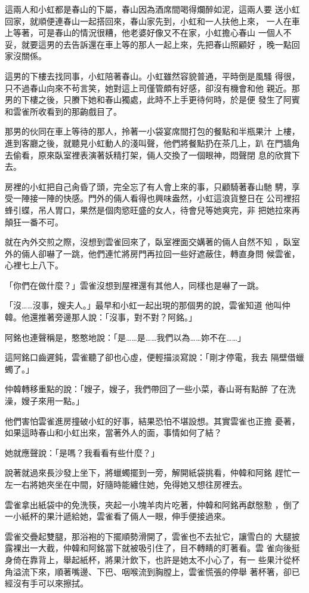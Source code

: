 這兩人和小虹都是春山的下屬，春山因為酒席間喝得爛醉如泥，這兩人要
送小虹回家，就順便連春山一起搭回來，春山家先到，小虹和一人扶他上來，
一人在車上等著，可是春山的情況很糟，他老婆好像又不在家，小虹擔心春山
一個人不妥，就要這男的去告訴還在車上等的那人一起上來，先把春山照顧好
，晚一點回家沒關係。

這男的下樓去找同事，小虹陪著春山。小虹雖然容貌普通，平時倒是風騷
得很，只不過春山向來不茍言笑，她對這上司僅管頗有好感，卻沒有機會和他
親近。那男的下樓之後，只賸下她和春山獨處，此時不上手更待何時，於是便
發生了阿賓和雲雀所收看到的那齣戲目了。

那男的伙同在車上等待的那人，拎著一小袋宴席間打包的餐點和半瓶果汁
上樓，進到客廳之後，就聽見小虹動人的淺叫聲，他們將餐點扔在茶几上，趴
在門牆角去偷看，原來臥室裡表演著妖精打架，倆人交換了一個眼神，悶聲閉
息的欣賞下去。

房裡的小虹把自己肏昏了頭，完全忘了有人會上來的事，只顧騎著春山馳
騁，享受一陣接一陣的快感。門外的倆人看得也興味盎然，小虹這浪貨整日在
公司裡招蜂引蝶，吊人胃口，果然是個肉慾旺盛的女人，待會兒等她爽完，非
把她拉來再顛狂一番不可。

就在內外交煎之際，沒想到雲雀回來了，臥室裡面交媾著的倆人自然不知
，臥室外的倆人卻嚇了一跳，他們連忙將房門再拉回一些好遮蔽住，轉直身問
候雲雀，心裡七上八下。

「你們在做什麼？」雲雀沒想到屋裡還有其他人，同樣也是嚇了一跳。

「沒……沒事，嫂夫人。」最早和小虹一起出現的那個男的說，雲雀知道
他叫仲韓。他還推著旁邊那人說：「沒事，對不對？阿銘。」

阿銘也連聲稱是，憨憨地說：「是……是……我們以為……妳不在……」

這阿銘口齒遲鈍，雲雀聽了卻也心虛，便輕描淡寫說：「剛才停電，我去
隔壁借蠟蠋了。」

仲韓轉移重點的說：「嫂子，嫂子，我們帶回了一些小菜，春山哥有點醉
了在洗澡，嫂子來用一點。」

他們害怕雲雀進房撞破小虹的好事，結果恐怕不堪設想。其實雲雀也正擔
憂著，如果這時春山和小虹出來，當著外人的面，事情如何了結？

她就應聲說：「是嗎？我看看有些什麼？」

說著就過來長沙發上坐下，將蠟蠋擺到一旁，解開紙袋挑看，仲韓和阿銘
趕忙一左一右將她夾坐在中間，好隨時能纏住她，免得她又想往房裡去。

雲雀拿出紙袋中的免洗筷，夾起一小塊羊肉片吃著，仲韓和阿銘再獻慇懃
，倒了一小紙杯的果汁遞給她，雲雀看了倆人一眼，伸手便接過來。

雲雀交疊起雙腿，那浴袍的下擺順勢滑開了，雲雀也不去扯它，讓雪白的
大腿披露裸出一大截，仲韓和阿銘當下就被吸引住了，目不轉睛的盯著看。雲
雀向後挺身倚在靠背上，舉起紙杯，將果汁飲下，也許是她太不小心了，有一
些果汁從杯角溢流下來，順著嘴邊、下巴、咽喉流到胸膛上，雲雀慌張的停舉
著杯箸，卻已經沒有手可以來擦拭。

